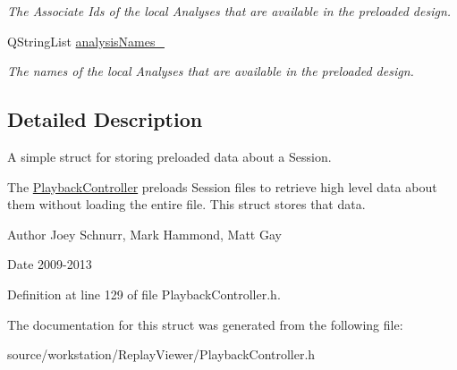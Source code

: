 \begin{DoxyCompactItemize}
\begin{DoxyCompactList}\small\item\em The Associate Ids of the local Analyses that are available in the preloaded design. \end{DoxyCompactList}\item 
\hypertarget{struct_preloaded_session_data_a364d1d51fc0403a62763c88dfa1c8c61}{Q\-String\-List \hyperlink{struct_preloaded_session_data_a364d1d51fc0403a62763c88dfa1c8c61}{analysis\-Names\-\_\-}}\label{struct_preloaded_session_data_a364d1d51fc0403a62763c88dfa1c8c61}

\begin{DoxyCompactList}\small\item\em The names of the local Analyses that are available in the preloaded design. \end{DoxyCompactList}\end{DoxyCompactItemize}


\subsection{Detailed Description}
A simple struct for storing preloaded data about a Session.

The \hyperlink{class_playback_controller}{Playback\-Controller} preloads Session files to retrieve high level data about them without loading the entire file. This struct stores that data. \begin{DoxyAuthor}{Author}
Joey Schnurr, Mark Hammond, Matt Gay 
\end{DoxyAuthor}
\begin{DoxyDate}{Date}
2009-\/2013 
\end{DoxyDate}


Definition at line 129 of file Playback\-Controller.\-h.



The documentation for this struct was generated from the following file\-:\begin{DoxyCompactItemize}
\item 
source/workstation/\-Replay\-Viewer/Playback\-Controller.\-h\end{DoxyCompactItemize}
